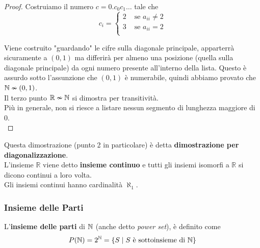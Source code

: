 \begin{proof}
	Costruiamo il numero $c = 0.c_0 c_1 \dots$ tale che
	$$ c_{i} = \begin{cases}
		2 & \text{ se } a_{ii} \neq 2 \\
		3 & \text{ se } a_{ii} = 2 \\
	\end{cases}$$
	
	Viene costruito "guardando" le cifre sulla diagonale principale, apparterrà sicuramente a $(0,1)$ ma differirà per almeno una posizione (quella sulla diagonale principale) da ogni numero presente all'interno della lista. Questo è assurdo sotto l'assunzione che $(0,1)$ è numerabile, quindi abbiamo provato che $\mathbb{N} \nsim (0,1)$.\\
	
	Il terzo punto $\mathbb{R} \nsim \mathbb{N}$ si dimostra per transitività.\\
	
	Più in generale, non si riesce a listare nessun segmento di lunghezza maggiore di 0.\\
\end{proof}

Questa dimostrazione (punto 2 in particolare) è detta \textbf{dimostrazione per diagonalizzazione}.\\

L'insieme $\mathbb{R}$ viene detto \textbf{insieme continuo} e tutti gli insiemi isomorfi a $\mathbb{R}$ si dicono continui a loro volta.\\

Gli insiemi continui hanno cardinalità $\aleph_1$.\\

\subsubsection{Insieme delle Parti}
L'\textbf{insieme delle parti} di $\mathbb{N}$ (anche detto \textit{power set}), è definito come
$$ P(\mathbb{N}) = 2^{\mathbb{N}} = \{S \mid S \text{ è sottoinsieme di } \mathbb{N}\} $$

